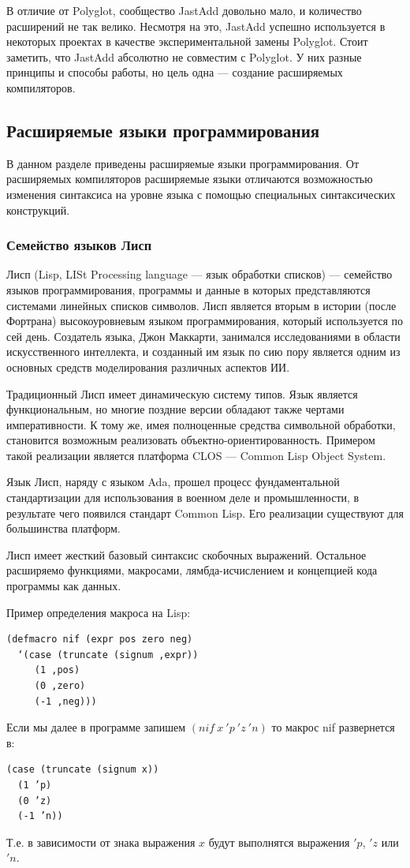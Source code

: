\documentclass[a4paper,12pt,titlepage]{extarticle}
\begin{document}
В отличие от Polyglot, сообщество JastAdd довольно мало, и количество
расширений не так велико. Несмотря на это, JastAdd успешно используется в
некоторых проектах в качестве экспериментальной замены Polyglot. Стоит
заметить, что JastAdd абсолютно не совместим с Polyglot. У них разные принципы
и способы работы, но цель одна --- создание расширяемых компиляторов.

\subsection{Расширяемые языки программирования}
\label{extlang}
В данном разделе приведены расширяемые языки программирования. От расширяемых
компиляторов расширяемые языки отличаются возможностью изменения синтаксиса на
уровне языка с помощью специальных синтаксических конструкций.

\subsubsection*{Семейство языков Лисп}
\label{lisp}
Лисп (Lisp, LISt Processing language --- язык обработки списков) --- семейство
языков программирования, программы и данные в которых представляются системами
линейных списков символов. Лисп является вторым в истории (после Фортрана)
высокоуровневым языком программирования, который используется по сей день.
Создатель языка, Джон Маккарти, занимался исследованиями в области
искусственного интеллекта, и созданный им язык по сию пору является одним из
основных средств моделирования различных аспектов ИИ.   

Традиционный Лисп имеет динамическую систему типов. Язык является
функциональным, но многие поздние версии обладают также чертами императивности.
К тому же, имея полноценные средства символьной обработки, становится возможным
реализовать объектно-ориентированность. Примером такой реализации является
платформа CLOS --- Common Lisp Object System.

Язык Лисп, наряду с языком Ada, прошел процесс фундаментальной стандартизации
для использования в военном деле и промышленности, в результате чего появился
стандарт Common Lisp. Его реализации существуют для большинства платформ.

Лисп имеет жесткий базовый синтаксис скобочных выражений. Остальное расширяемо
функциями, макросами, лямбда-исчислением и концепцией кода программы как
данных.

Пример определения макроса на Lisp:
\begin{verbatim}
(defmacro nif (expr pos zero neg)
  ‘(case (truncate (signum ,expr))
     (1 ,pos)
     (0 ,zero)
     (-1 ,neg)))
\end{verbatim}
Если мы далее в программе запишем $(nif ~ x ~ 'p ~ 'z ~ 'n)$ то макрос nif
развернется в:
\begin{verbatim}
(case (truncate (signum x))
  (1 ’p)
  (0 ’z)
  (-1 ’n))
\end{verbatim}
Т.е. в зависимости от знака выражения $x$ будут выполнятся выражения $'p$, $'z$
или $'n$.
\end{document}
